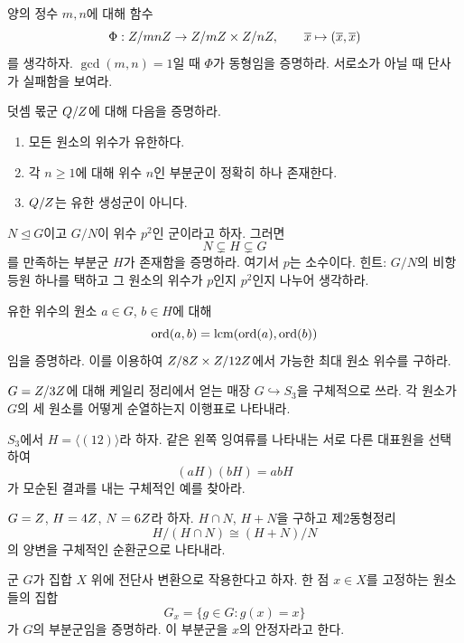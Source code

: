 \begin{exercise}
양의 정수 $m,n$에 대해 함수
\[
  \Phi:Z/mnZ\to Z/mZ\times Z/nZ,
  \qquad \overline x\mapsto(\overline x,\overline x)
\]
를 생각하자. $\gcd(m,n)=1$일 때 $\Phi$가 동형임을 증명하라. 서로소가 아닐 때 단사가 실패함을 보여라.
\end{exercise}

\begin{exercise}[$\Q/\Z$]
덧셈 몫군 $\Q/\Z$에 대해 다음을 증명하라.
\begin{enumerate}[label=(\alph*)]
  \item 모든 원소의 위수가 유한하다.
  \item 각 $n\ge1$에 대해 위수 $n$인 부분군이 정확히 하나 존재한다.
  \item $\Q/\Z$는 유한 생성군이 아니다.
\end{enumerate}
\end{exercise}

\begin{exercise}[대응정리 응용]
$N\trianglelefteq G$이고 $G/N$이 위수 $p^2$인 군이라고 하자. 그러면
\[
  N\subsetneq H\subsetneq G
\]
를 만족하는 부분군 $H$가 존재함을 증명하라. 여기서 $p$는 소수이다. 힌트: $G/N$의 비항등원 하나를 택하고 그 원소의 위수가 $p$인지 $p^2$인지 나누어 생각하라.
\end{exercise}

\begin{exercise}[직접곱의 원소 위수]
유한 위수의 원소 $a\in G$, $b\in H$에 대해
\[
  \operatorname{ord}(a,b)=\operatorname{lcm}(\operatorname{ord}(a),\operatorname{ord}(b))
\]
임을 증명하라. 이를 이용하여 $Z/8Z\times Z/12Z$에서 가능한 최대 원소 위수를 구하라.
\end{exercise}

\begin{exercise}
$G=Z/3Z$에 대해 케일리 정리에서 얻는 매장 $G\hookrightarrow S_3$을 구체적으로 쓰라. 각 원소가 $G$의 세 원소를 어떻게 순열하는지 이행표로 나타내라.
\end{exercise}

\begin{exercise}[비정규부분군과 몫의 실패]
$S_3$에서 $H=\langle(12)\rangle$라 하자. 같은 왼쪽 잉여류를 나타내는 서로 다른 대표원을 선택하여
\[
  (aH)(bH)=abH
\]
가 모순된 결과를 내는 구체적인 예를 찾아라.
\end{exercise}

\begin{exercise}[제2동형정리 계산]
$G=Z$, $H=4Z$, $N=6Z$라 하자. $H\cap N$, $H+N$을 구하고 제2동형정리
\[
  H/(H\cap N)\cong(H+N)/N
\]
의 양변을 구체적인 순환군으로 나타내라.
\end{exercise}

\begin{exercise}
군 $G$가 집합 $X$ 위에 전단사 변환으로 작용한다고 하자. 한 점 $x\in X$를 고정하는 원소들의 집합
\[
  G_x=\{g\in G:g(x)=x\}
\]
가 $G$의 부분군임을 증명하라. 이 부분군을 $x$의 안정자라고 한다.
\end{exercise}
